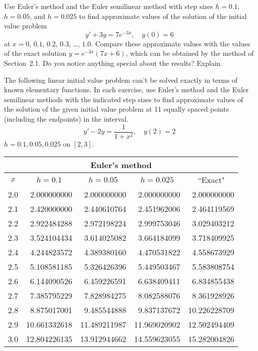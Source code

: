 \documentclass{ximera}
\begin{document}
\begin{problem}\label{exer:3.1.13} 
Use Euler's method and the Euler semilinear method with step sizes
$h=0.1$, $h=0.05$, and $h=0.025$ to find approximate values of the
solution of the initial value problem
$$
y'+3y=7e^{-3x},\quad y(0)=6
$$
at $x=0$, $0.1$, $0.2$, $0.3$, \dots, $1.0$. Compare these approximate values with
the values of the exact solution $y=e^{-3x}(7x+6)$, which can be
obtained by the method of Section~2.1. Do you notice anything
special about the results? Explain.
\end{problem}

\begin{problem}\label{exer:3.1.14} The following linear initial value problem can't be solved exactly in terms of known elementary functions. In each exercise, use
Euler's method and the Euler semilinear methods
with the indicated step sizes to find approximate values of the
solution of the given initial value problem at 11 equally spaced
points (including the endpoints) in the interval.
$$y'-2y=\frac{1}{1+x^2},\quad y(2)=2$$
$h=0.1,0.05,0.025$ on $[2,3]$.



\begin{solution}
    {\small
\begin{tabular}{|c|r|r|r|r|}
\hline
\multicolumn{5}{|c|}{Euler's method}\\\hline
\multicolumn{1}{|c|}{$x$}&
\multicolumn{1}{|c|}{$h=0.1$}&
\multicolumn{1}{|c|}{$h=0.05$}&
\multicolumn{1}{|c|}{$h=0.025$}&
\multicolumn{1}{|c|}{``Exact"}\\ \hline
2.0 &  2.000000000 &  2.000000000 &  2.000000000 &  2.000000000 \\
2.1 &  2.420000000 &  2.440610764 &  2.451962006 &  2.464119569 \\
2.2 &  2.922484288 &  2.972198224 &  2.999753046 &  3.029403212 \\
2.3 &  3.524104434 &  3.614025082 &  3.664184099 &  3.718409925 \\
2.4 &  4.244823572 &  4.389380160 &  4.470531822 &  4.558673929 \\
2.5 &  5.108581185 &  5.326426396 &  5.449503467 &  5.583808754 \\
2.6 &  6.144090526 &  6.459226591 &  6.638409411 &  6.834855438 \\
2.7 &  7.385795229 & 7.828984275  & 8.082588076  & 8.361928926 \\
2.8 &  8.875017001 & 9.485544888  & 9.837137672  & 10.226228709 \\
2.9 & 10.661332618 & 11.489211987 & 11.969020902 & 12.502494409 \\
3.0 &12.804226135 & 13.912944662 & 14.559623055 & 15.282004826 \\
\hline
\end{tabular}}


\end{solution}
\end{problem}
\end{document}
